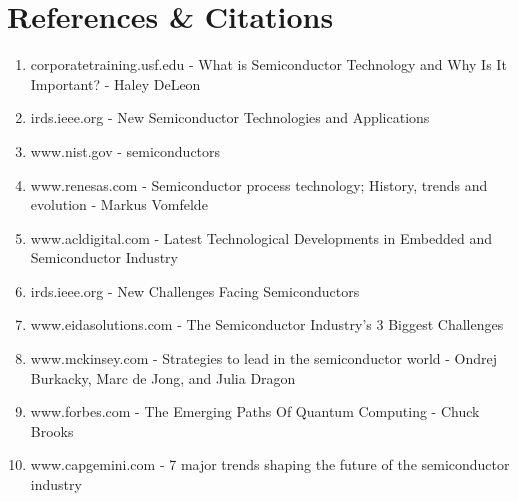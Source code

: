 \documentclass[12pt]{article}
\begin{document}
	\pagebreak
	
	\section{References \& Citations}
		\begin{enumerate}
			\item corporatetraining.usf.edu - What is Semiconductor Technology and Why Is It Important? - Haley DeLeon
			\item irds.ieee.org - New Semiconductor Technologies and Applications
			\item www.nist.gov - semiconductors
			\item www.renesas.com - Semiconductor process technology; History, trends and evolution - Markus Vomfelde
			\item www.acldigital.com - Latest Technological Developments in Embedded and Semiconductor Industry
			\item irds.ieee.org - New Challenges Facing Semiconductors
			\item www.eidasolutions.com - The Semiconductor Industry’s 3 Biggest Challenges
			\item www.mckinsey.com - Strategies to lead in the semiconductor world - Ondrej Burkacky, Marc de Jong, and Julia Dragon
			\item www.forbes.com - The Emerging Paths Of Quantum Computing - Chuck Brooks
			\item www.capgemini.com - 7 major trends shaping the future of the semiconductor industry
		\end{enumerate}
	
\end{document}
